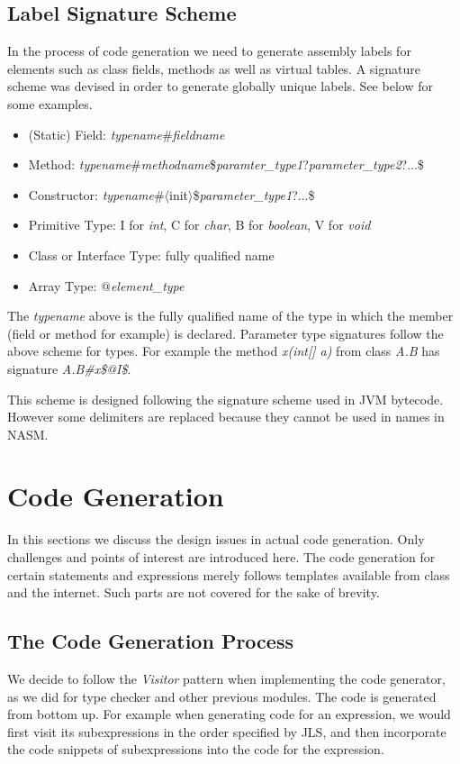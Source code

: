 \documentclass[a4paper, notitlepage]{report}
\begin{document}
\subsection{Label Signature Scheme}
In the process of code generation we need to generate assembly labels for elements such as class fields, methods as well as virtual tables. A signature scheme was devised in order to generate globally unique labels. See below for some examples.
\begin{itemize}
\item (Static) Field: \emph{typename}\#\emph{fieldname}
\item Method: \emph{typename}\#\emph{methodname}\$\emph{paramter\_type1}?\emph{parameter\_type2}?...\$
\item Constructor: \emph{typename}\#$\langle$init$\rangle$\$\emph{parameter\_type1}?...\$
\item Primitive Type: I for \emph{int}, C for \emph{char}, B for \emph{boolean}, V for \emph{void}
\item Class or Interface Type: fully qualified name
\item Array Type: @\emph{element\_type}
\end{itemize}
The \emph{typename} above is the fully qualified name of the type in which the member (field or method for example) is declared. Parameter type signatures follow the above scheme for types. For example the method \emph{x(int[] a)} from class \emph{A.B} has signature \emph{A.B\#x\$@I\$}.

This scheme is designed following the signature scheme used in JVM bytecode. However some delimiters are replaced because they cannot be used in names in NASM.

\section{Code Generation}
\label{codegen}
In this sections we discuss the design issues in actual code generation. Only challenges and points of interest are introduced here. The code generation for certain statements and expressions merely follows templates available from class and the internet. Such parts are not covered for the sake of brevity.

\subsection{The Code Generation Process}
\label{codegen_process}

We decide to follow the \emph{Visitor} pattern when implementing the code generator, as we did for type checker and other previous modules. The code is generated from bottom up. For example when generating code for an expression, we would first visit its subexpressions in the order specified by JLS, and then incorporate the code snippets of subexpressions into the code for the expression.
\end{document}
